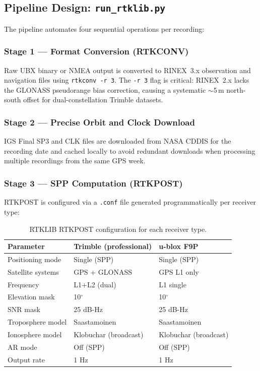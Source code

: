\documentclass[12pt,a4paper]{article}
\newcommand{\code}[1]{\texttt{#1}}
\begin{document}
\subsection{Pipeline Design: \texttt{run\_rtklib.py}}

The pipeline automates four sequential operations per recording:

\subsubsection{Stage 1 --- Format Conversion (RTKCONV)}

Raw UBX binary or NMEA output is converted to RINEX~3.x observation and navigation
files using \code{rtkconv -r 3}. The \code{-r 3} flag is critical: RINEX~2.x lacks the
GLONASS pseudorange bias correction, causing a systematic $\sim$5\,m north-south offset
for dual-constellation Trimble datasets.

\subsubsection{Stage 2 --- Precise Orbit and Clock Download}

IGS Final SP3 and CLK files are downloaded from NASA CDDIS for the recording date and
cached locally to avoid redundant downloads when processing multiple recordings from
the same GPS week.

\subsubsection{Stage 3 --- SPP Computation (RTKPOST)}

RTKPOST is configured via a \code{.conf} file generated programmatically per receiver
type:

\begin{table}[H]
  \centering
  \caption{RTKLIB RTKPOST configuration for each receiver type.}
  \begin{tabular}{lll}
    \toprule
    \textbf{Parameter} & \textbf{Trimble (professional)} & \textbf{u-blox F9P} \\
    \midrule
    Positioning mode      & Single (SPP)        & Single (SPP) \\
    Satellite systems     & GPS + GLONASS       & GPS L1 only \\
    Frequency             & L1+L2 (dual)        & L1 single \\
    Elevation mask        & 10$^\circ$          & 10$^\circ$ \\
    SNR mask              & 25 dB-Hz            & 25 dB-Hz \\
    Troposphere model     & Saastamoinen        & Saastamoinen \\
    Ionosphere model      & Klobuchar (broadcast) & Klobuchar (broadcast) \\
    AR mode               & Off (SPP)           & Off (SPP) \\
    Output rate           & 1 Hz                & 1 Hz \\
    \bottomrule
  \end{tabular}
\end{table}
\end{document}
